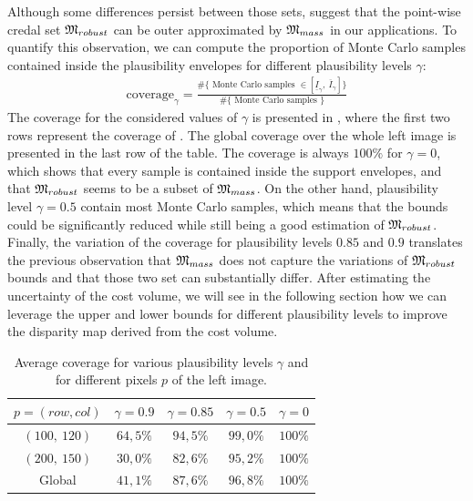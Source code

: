Although some differences persist between those sets,  suggest that the point-wise credal set $\mathfrak{M}_{robust}$ can be outer approximated by $\mathfrak{M}_{mass}$ in our applications. To quantify this observation, we can compute the proportion of Monte Carlo samples contained inside the plausibility envelopes for different plausibility levels $\gamma$:
\begin{align}
    \textrm{coverage}_\gamma = \frac{\#\{\textrm{ Monte Carlo samples }\in[\underline{I}_\gamma,~\overline{I}_\gamma]\}}{\#\{\textrm{ Monte Carlo samples }\}}
\end{align}
The coverage for the considered values of $\gamma$ is presented in , where the first two rows represent the coverage of . The global coverage over the whole left image is presented in the last row of the table. The coverage is always $100\%$ for $\gamma=0$, which shows that every sample is contained inside the support envelopes, and that $\mathfrak{M}_{robust}$ seems to be a subset of $\mathfrak{M}_{mass}$. On the other hand, plausibility level $\gamma=0.5$ contain most Monte Carlo samples, which means that the bounds could be significantly reduced while still being a good estimation of $\mathfrak{M}_{robust}$. Finally, the variation of the coverage for plausibility levels $0.85$ and $0.9$ translates the previous observation that $\mathfrak{M}_{mass}$ does not capture the variations of $\mathfrak{M}_{robust}$ bounds and that those two set can substantially differ. After estimating the uncertainty of the cost volume, we will see in the following section how we can leverage the upper and lower bounds for different plausibility levels to improve the disparity map derived from the cost volume.  

\begin{table}[ht]
\centering
\begin{tabular}{|c|c|c|c|c|}
\hline
\rowcolor[HTML]{C0C0C0}
$p=(row,col)$ & $\gamma=0.9$  & $\gamma=0.85$ & $\gamma=0.5$  & $\gamma=0$   \\ \hline
\cellcolor[HTML]{C0C0C0}$(100,~120)$     & $64,5\%$ & $94,5\%$ & $99,0\%$ & $100\%$ \\ \hline
\cellcolor[HTML]{C0C0C0}$(200,~150)$     & $30,0\%$ & $82,6\%$ & $95,2\%$ & $100\%$ \\ \hline
\cellcolor[HTML]{C0C0C0}Global        & $41,1\%$ & $87,6\%$ & $96,8\%$ & $100\%$ \\ \hline
\end{tabular}
\caption{Average coverage for various plausibility levels $\gamma$ and for different pixels $p$ of the left image.}\label{tab:Coverage}
\end{table}

